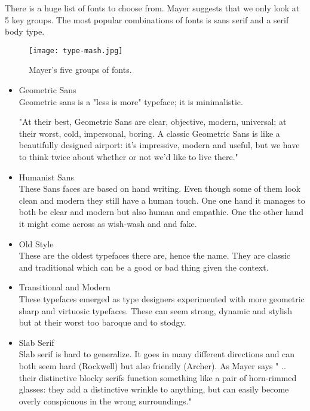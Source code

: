 There is a huge list of fonts to choose from. Mayer suggests that we only look at 5 key groups.
The most popular combinations of fonts is sans serif and a serif body type. \cite{TypeComb} 

\begin{figure}[H]
\centering
\texttt{[image: type-mash.jpg]}
\caption{Mayer's five groups of fonts. \cite{Font}}
\end{figure}

\begin{itemize}

\item
Geometric Sans
\\
Geometric sans is a "less is more" typeface; it is minimalistic.

"At their best, Geometric Sans are clear, objective, modern, universal; at their worst, cold, impersonal, boring. A classic Geometric Sans is like a beautifully designed airport: it's impressive, modern and useful, but we have to think twice about whether or not we'd like to live there." \cite{Font} %

\item
Humanist Sans
\\
These Sans faces are based on hand writing. Even though some of them look clean and modern they still have a human touch. One one hand it manages to both be clear and modern but also human and empathic. One the other hand it might come across as wish-wash and and fake. \cite{Font}

\item
Old Style
\\
These are the oldest typefaces there are, hence the name. 
They are classic and traditional which can be a good or bad thing given the context. 

\item
Transitional and Modern
\\
These typefaces emerged as type designers experimented with more geometric sharp and virtuosic typefaces. 
These can seem strong, dynamic and stylish but at their worst too baroque and to stodgy. \cite{Font} 

\item
Slab Serif
\\
Slab serif is hard to generalize. It goes in many different directions and can both seem hard (Rockwell) but also friendly (Archer). As Mayer says " .. their distinctive blocky serifs function something like a pair of horn-rimmed glasses: they add a distinctive wrinkle to anything, but can easily become overly conspicuous in the wrong surroundings." \cite{Font}
\end{itemize}

